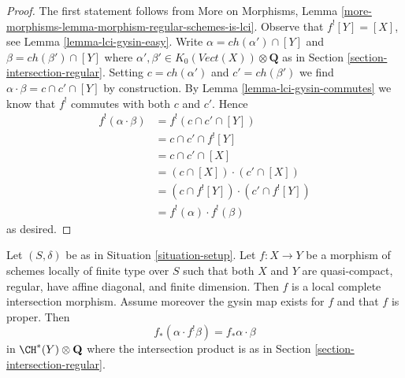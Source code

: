 \begin{proof}
The first statement follows from
More on Morphisms, Lemma
\ref{more-morphisms-lemma-morphism-regular-schemes-is-lci}.
Observe that $f^![Y] = [X]$, see Lemma \ref{lemma-lci-gysin-easy}.
Write $\alpha = ch(\alpha') \cap [Y]$ and $\beta = ch(\beta') \cap [Y]$
where $\alpha', \beta' \in K_0(\textit{Vect}(X)) \otimes \mathbf{Q}$
as in Section \ref{section-intersection-regular}.
Setting $c = ch(\alpha')$ and $c' = ch(\beta')$ we find
$\alpha \cdot \beta = c \cap c' \cap [Y]$ by construction.
By Lemma \ref{lemma-lci-gysin-commutes} we know that $f^!$
commutes with both $c$ and $c'$. Hence
\begin{align*}
f^!(\alpha \cdot \beta)
& =
f^!(c \cap c' \cap [Y]) \\
& =
c \cap c' \cap f^![Y] \\
& =
c \cap c' \cap [X] \\
& =
(c \cap [X]) \cdot (c' \cap [X]) \\
& =
(c \cap f^![Y]) \cdot (c' \cap f^![Y]) \\
& =
f^!(\alpha) \cdot f^!(\beta)
\end{align*}
as desired.
\end{proof}

\begin{lemma}
\label{lemma-projection-formula-regular}
Let $(S, \delta)$ be as in Situation \ref{situation-setup}.
Let $f : X \to Y$ be a morphism of schemes locally of finite
type over $S$ such that both $X$ and $Y$ are quasi-compact,
regular, have affine diagonal, and finite dimension.
Then $f$ is a local complete intersection morphism.
Assume moreover the gysin map exists for $f$
and that $f$ is proper. Then
$$
f_*(\alpha \cdot f^!\beta) = f_*\alpha \cdot \beta
$$
in $\CH^*(Y) \otimes \mathbf{Q}$ where the intersection product
is as in Section \ref{section-intersection-regular}.
\end{lemma}

